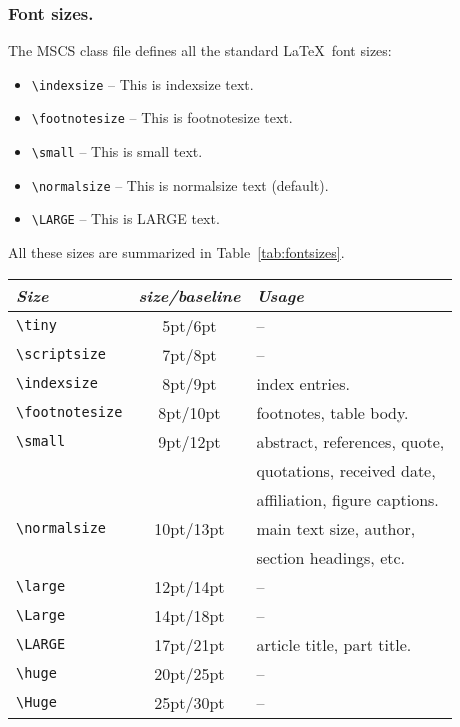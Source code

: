 \documentclass{mscs}
\begin{document}
\subsubsection{Font sizes.}

The MSCS class file defines all the standard \LaTeX\ font sizes:
\begin{itemize}
  \item \verb"\indexsize" -- {\indexsize This is indexsize text.}
  \item \verb"\footnotesize" -- {\footnotesize This is footnotesize text.}
  \item \verb"\small" -- {\small This is small text.}
  \item \verb"\normalsize" -- This is normalsize text (default).
  \item \verb"\LARGE" -- {\LARGE This is LARGE text.}
\end{itemize}
%
All these sizes are summarized in Table~\ref{tab:fontsizes}.
%
\begin{table*}[hbt]
\caption{Type sizes for \LaTeX\ size-changing commands.}
\label{tab:fontsizes}
 \begin{tabular}{lcl}
 \hline\hline
 \textit{Size}        &  \textit{size/baseline} & \textit{Usage}\\
 \hline
 \verb"\tiny"         &  5pt/6pt  & -- \\
 \verb"\scriptsize"   &  7pt/8pt  & -- \\
 \verb"\indexsize"    &  8pt/9pt  & index entries. \\
 \verb"\footnotesize" &  8pt/10pt & footnotes, table body. \\
 \verb"\small"        &  9pt/12pt & abstract, references, quote, \\
                      &           & quotations, received date, \\
                      &           & affiliation, figure captions. \\
 \verb"\normalsize"   & 10pt/13pt & main text size, author,\\
                      &           & section headings, etc. \\
 \verb"\large"        & 12pt/14pt & -- \\
 \verb"\Large"        & 14pt/18pt & -- \\
 \verb"\LARGE"        & 17pt/21pt & article title, part title. \\
 \verb"\huge"         & 20pt/25pt & -- \\
 \verb"\Huge"         & 25pt/30pt & -- \\
 \hline\hline
 \end{tabular}
\end{table*}
\end{document}
